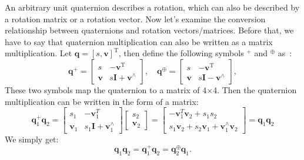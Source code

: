 An arbitrary unit quaternion describes a rotation, which can also be described by a rotation matrix or a rotation vector. Now let's examine the conversion relationship between quaternions and rotation vectors/matrices. Before that, we have to say that quaternion multiplication can also be written as a matrix multiplication. Let $\mathbf{q}=[s,\mathbf{v}]^\mathrm{T}$, then define the following symbols $^{+}$ and $^{\oplus}$ as~\cite{Barfoot2011}:
\begin{equation}
	\mathbf{q}^{+}=\left[\begin{array}{cc}
		s&-\mathbf{v}^\mathrm{T} \\
		\mathbf{v}&s\mathbf{I}+\mathbf{v}^{\wedge}
	\end{array}\right],\quad
	\mathbf{q}^{\oplus}=
	\left[\begin{array}{cc}
		s & -\mathbf{v}^\mathrm{T} \\
		\mathbf{v} & s\mathbf{I}-\mathbf{v}^{\wedge}
	\end{array}\right],
\end{equation}
These two symbols map the quaternion to a matrix of 4$\times$4. Then the quaternion multiplication can be written in the form of a matrix:
\begin{equation}
	\mathbf{q}_1^ + {\mathbf{q}_2} = \left[ {\begin{array}{*{20}{c}}
			s_1&-\mathbf{v}_1^T\\
			\mathbf{v}_1 & s_1 \mathbf{I} + \mathbf{v}_1^\wedge
	\end{array}} \right]\left[ {\begin{array}{*{20}{c}}
			{{s _2}} \\
			{{\mathbf{v} _2}}
	\end{array}} \right] = \left[ {\begin{array}{*{20}{c}}
			{ - \mathbf{v} _1^T{\mathbf{v} _2} + {s _1}{s _2}} \\
			{{s _1}{\mathbf{v} _2} + {s _2}{\mathbf{v} _1} + \mathbf{v} _1^ \wedge {\mathbf{v} _2}}
	\end{array}} \right] = \mathbf{q}_1 \mathbf{q}_2
\end{equation}
We simply get:
\begin{equation}
	\mathbf{q}_1 \mathbf{q}_2 = \mathbf{q}_1^{+} \mathbf{q}_2 = \mathbf{q}_2^{\oplus} \mathbf{q}_1.
\end{equation}

